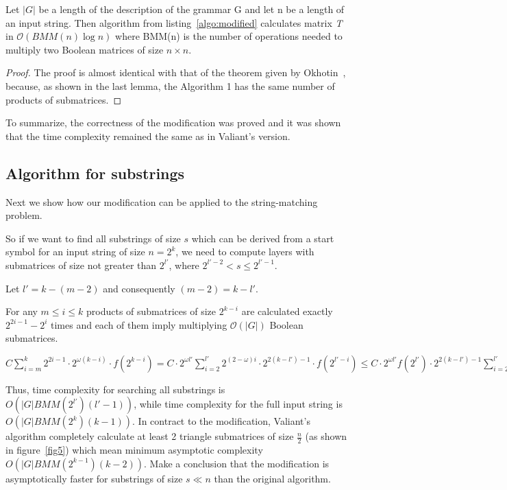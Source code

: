 \begin{theorem}
Let $|G|$ be a length of the description of the grammar G and let n be a length of an input string. Then algorithm from listing~\ref{algo:modified} calculates matrix \textit{T} in $\mathcal{O}(BMM(n)\log{n})$ where BMM(n) is the number of operations needed to multiply two Boolean matrices of size $n \times n$.
\end{theorem}

\begin{proof}
The proof is almost identical with that of the theorem given by Okhotin~\cite{Okhotin:2014:PMM:2565359.2565379}, because, as shown in the last lemma, the Algorithm 1 has the same number of products of submatrices.
\end{proof}

To summarize, the correctness of the modification was proved and it was shown that the time complexity remained the same as in Valiant's version.

\subsection{Algorithm for substrings}

Next we show how our modification can be applied to the string-matching problem.

So if we want to find all substrings of size $s$ which can be derived from a start symbol for an input string of size $n = 2^k$, we need to compute layers with submatrices of size not greater than $2^{l'}$, where $2^{l' - 2} < s \le 2^{l' - 1}$.

Let $l' = k - (m - 2)$ and consequently $(m - 2) = k - l'$.

For any  $m \le i \le k$ products of submatrices of size $2^{k - i}$ are calculated exactly $2^{2i - 1} - 2^{i}$ times and each of them imply multiplying $\mathcal{O}(|G|)$ Boolean submatrices.

$ C \sum\limits_{i=m}^k 2^{2i - 1} \cdot 2^{\omega(k - i)} \cdot f(2^{k - i}) = C \cdot 2^{\omega l'}\sum\limits_{i=2}^{l'} 2^{(2 - \omega)i} \cdot 2^{2(k - l') - 1} \cdot f(2^{l' - i}) \le C \cdot 2^{\omega l'} f(2^{l'}) \cdot 2^{2(k - l') - 1} \sum\limits_{i=2}^{l'} 2^{(2 - \omega)i} = BMM(2^{l'}) \cdot 2^{2(k - l') - 1} \sum\limits_{i=2}^{l'} 2^{(2 - \omega)i}$

Thus, time complexity for searching all substrings is  $O(|G|BMM(2^{l'})(l' - 1))$, while time complexity for the full input string is $O(|G|BMM(2^k)(k - 1))$. In contract to the modification, Valiant's algorithm completely calculate at least 2 triangle submatrices of size $\frac{n}{2}$ (as shown in figure~\ref{fig5}) which mean minimum asymptotic complexity  $O(|G|BMM(2^{k - 1})(k - 2))$. Make a conclusion that the modification is asymptotically faster for substrings of size $s \ll n$  than the original algorithm.

